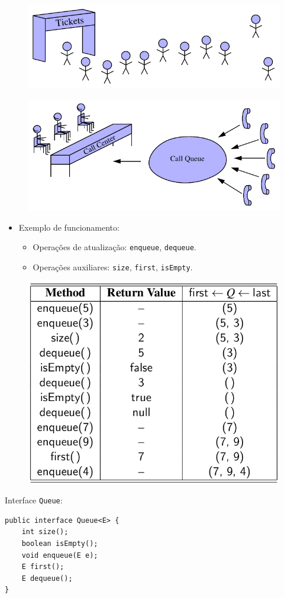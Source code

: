 \begin{figure}[H]
	\centering
	\includegraphics[width=0.5\linewidth]{img/figure-6-4a}
\end{figure}
\vspace{-10pt}
\begin{figure}[H]
	\centering
	\includegraphics[width=0.5\linewidth]{img/figure-6-4b}
\end{figure}

\begin{itemize}
	\item Exemplo de funcionamento:
	\begin{itemize}
		\item Operações de atualização: \texttt{enqueue}, \texttt{dequeue}.
		\item Operações auxiliares: \texttt{size}, \texttt{first}, \texttt{isEmpty}.
	\end{itemize}
\end{itemize}

\begin{figure}[H]
	\centering
	\includegraphics[width=0.45\linewidth]{img/example-6-4}
\end{figure}

\clearpage

Interface \texttt{Queue}:
\begin{verbatim}
public interface Queue<E> {
	int size();
	boolean isEmpty();
	void enqueue(E e);
	E first();
	E dequeue();	
}
\end{verbatim}


